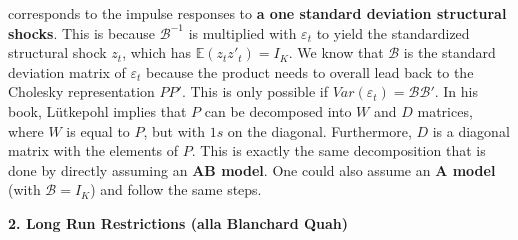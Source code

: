 \documentclass[a4paper, 12pt]{article}
\begin{document}
corresponds to the impulse responses to \textbf{a one standard deviation structural shocks}. This is because $\mathcal{B}^{-1}$ is multiplied with $\varepsilon_t$ to yield the standardized structural shock $z_t$, which has $\mathbb{E}(z_tz'_t)=I_{K}$.
We know that $\mathcal{B}$ is the standard deviation matrix of $\varepsilon_t$ because the product needs to overall lead back to the Cholesky representation $PP'$. This is only possible if $Var(\varepsilon_t)=\mathcal{B}\mathcal{B}'$. 
In his book, Lütkepohl implies that $P$ can be decomposed into $W$ and $D$ matrices, where $W$ is equal to $P$, but with $1s$ on the diagonal. Furthermore, $D$ is a diagonal matrix with the elements of $P$. 
This is exactly the same decomposition that is done by directly assuming an \textbf{AB model}. One could also assume an \textbf{A model} (with $\mathcal{B}=I_K$) and follow the same steps. 
\begin{center}
\textbf{2. Long Run Restrictions (alla Blanchard Quah)}
\end{center}
\end{document}
